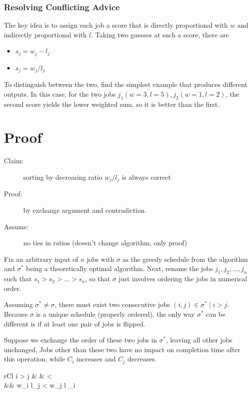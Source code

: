 \documentclass[11pt]{article}
\begin{document}
	\subsubsection{Resolving Conflicting Advice}
		The key idea is to assign each job a score that is directly proportional with $w$ and indirectly proportional with $l$. Taking two guesses at such a score, there are 
		\begin{itemize}
			\item $s_j = w_j - l_j$
			\item $s_j = w_j / l_j$
		\end{itemize}
		To distinguish between the two, find the simplest example that produces different outputs. In this case, for the two jobs $j_1(w=3, l=5), j_2(w=1,l=2)$, the second score yields the lower weighted sum, so it is better than the first.
		
\section{Proof}
	\begin{description}
		\item[Claim:] sorting by decreasing ratio $w_j / l_j$ is always correct
		\item[Proof:] by exchange argument and contradiction.
		\item[Assume:] no ties in ratios (doesn't change algorithm, only proof)
	\end{description}
	
	Fix an arbitrary input of $n$ jobs with $\sigma$ as the greedy schedule from the algorithm and $\sigma^*$ being a theoretically optimal algorithm. Next, rename the jobs $j_1, j_2, \ldots , j_n$ such that $s_1 > s_2 > \ldots > s_n$, so that $\sigma$ just involves ordering the jobs in numerical order.
	
	Assuming $\sigma^* \neq \sigma$, there must exist two consecutive jobs $(i, j) \in \sigma^* \mid i > j$. Because $\sigma$ is a unique schedule (properly ordered), the only way $\sigma^*$ can be different is if at least one pair of jobs is flipped.
	
	Suppose we exchange the order of these two jobs in $\sigma^*$, leaving all other jobs unchanged. Jobs other than these two have no impact on completion time after this operation, while $C_i$ increases and $C_j$ decreases.
	
	\begin{IEEEeqnarray}{rCl}
		i > j & \rightarrow &  < \\
		&& w_i l_j < w_j l _i
	\end{IEEEeqnarray}
	
\end{document}
